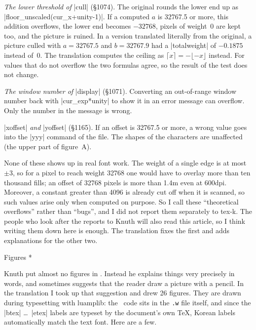 {\list[\numbered]\raggedright
\item {\it The lower threshold of\/} |cull| (\S1074). The original rounds
the lower end up as |floor_unscaled(cur_x+unity-1)|. If a computed $a$
is 32767.5 or more, this addition overflows, the lower end becomes
$-32768$, pixels of weight~0 are kept too, and the picture is ruined.
In a version translated literally from the original, a picture culled
with $a=32767.5$ and $b=32767.9$ had a |totalweight| of $-0.1875$
instead of~0. The translation computes the ceiling as
$\lceil x\rceil=-\lfloor -x\rfloor$ instead. For values that do not
overflow the two formulas agree, so the result of the  test
does not change.
\item {\it The window number of\/} |display| (\S1071). Converting an
out-of-range window number back with |cur_exp*unity| to show it in an
error message can overflow. Only the number in the message is wrong.
\item |xoffset| {\it and\/} |yoffset| (\S1165). If an offset is
32767.5 or more, a wrong value goes into the |yyy| command of the
 file. The shapes of the characters are unaffected (the upper
part of figure~A).
\endlist

None of these shows up in real font work. The weight of a single edge
is at most $\pm3$, so for a pixel to reach weight 32768 one would have
to overlay more than ten thousand fills; an offset of 32768 pixels is
more than 1.4\thinspace m even at 600\thinspace dpi. Moreover, a
constant greater than 4096 is already cut off when it is scanned, so
such values arise only when computed on purpose. So I call these
``theoretical overflows'' rather than ``bugs'', and I did not report
them separately to tex-k. The people who look after the reports to
Knuth will also read this article, so I think writing them down here is
enough. The translation fixes the first and adds explanations for the
other two.

\quad Figures *

Knuth put almost no figures in \MFTP. Instead he explains things very
precisely in words, and sometimes suggests that the reader draw a
picture with a pencil. In the translation I took up that suggestion and
drew 26 figures. They are drawn during typesetting with luamplib: the
\MP\ code sits in the {\tt .w} file itself, and since the
|btex| \dots\ |etex| labels are typeset by the document's own \TeX,
Korean labels automatically match the text font. Here are a few.

}
